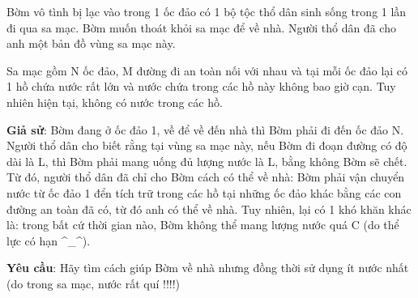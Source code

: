 Bờm vô tình bị lạc vào trong 1 ốc đảo có 1 bộ tộc thổ dân sinh sống trong 1 lần đi qua sa mạc. Bờm muốn thoát khỏi sa mạc để về nhà. Người thổ dân đã cho anh một bản đồ vùng sa mạc này.

Sa mạc gồm N ốc đảo, M đường đi an toàn nối với nhau và tại mỗi ốc đảo lại có 1 hồ chứa nước rất lớn và nước chứa trong các hồ này không bao giờ cạn. Tuy nhiên hiện tại, không có nước trong các hồ.

\textbf{Giả sử}: Bờm đang ở ốc đảo 1, về để về đến nhà thì Bờm phải đi đến ốc đảo N. Người thổ dân cho biết rằng tại vùng sa mạc này, nếu Bờm đi đoạn đường có độ dài là L, thì Bờm phải mang uống đủ lượng nước là L, bằng không Bờm sẽ chết. Từ đó, người thổ dân đã chỉ cho Bờm cách có thể về nhà: Bờm phải vận chuyển nước từ ốc đảo 1 đển tích trữ trong các hồ tại những ốc đảo khác bằng các con đường an toàn đã có, từ đó anh có thể về nhà. Tuy nhiên, lại có 1 khó khăn khác là: trong bất cứ thời gian nào, Bờm không thể mang lượng nước quá C (do thể lực có hạn ^\_^).

\textbf{Yêu cầu}: Hãy tìm cách giúp Bờm về nhà nhưng đồng thời sử dụng ít nước nhất (do trong sa mạc, nước rất quí !!!!)